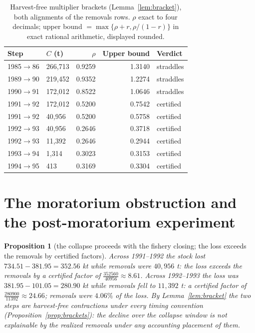 \documentclass[10pt,twocolumn]{article}
\theoremstyle{plain}
\newtheorem{proposition}[theorem]{Proposition}
\theoremstyle{remark}
\begin{document}
\begin{table}[t]
\centering
\scriptsize
\setlength{\tabcolsep}{3.2pt}
\caption{Harvest-free multiplier brackets (Lemma~\ref{lem:bracket}),
both alignments of the removals rows. \(\rho\) exact to four decimals;
upper bound \(=\max\{\rho+r, \rho/(1-r)\}\) in exact rational
arithmetic, displayed rounded.}
\label{tab:brackets}
\begin{tabular}{@{}l l r r l@{}}
\toprule
Step & \(C\) (t) & \(\rho\) & Upper bound & Verdict \\
\midrule
1985$\to$86 & 266{,}713 & 0.9259 & 1.3140 & straddles \\
1989$\to$90 & 219{,}452 & 0.9352 & 1.2274 & straddles \\
1990$\to$91 & 172{,}012 & 0.8522 & 1.0646 & straddles \\
1991$\to$92 & 172{,}012 & 0.5200 & 0.7542 & certified \\
1991$\to$92 & 40{,}956 & 0.5200 & 0.5758 & certified \\
1992$\to$93 & 40{,}956 & 0.2646 & 0.3718 & certified \\
1992$\to$93 & 11{,}392 & 0.2646 & 0.2944 & certified \\
1993$\to$94 & 1{,}314 & 0.3023 & 0.3153 & certified \\
1994$\to$95 & 413 & 0.3169 & 0.3304 & certified \\
\bottomrule
\end{tabular}
\end{table}

\section{The moratorium obstruction and the post-moratorium
experiment}\label{moratorium}

\begin{proposition}[the collapse proceeds with the fishery closing;
the loss exceeds the removals by certified factors]
\label{prop:moratorium}
Across 1991--1992 the stock lost \(734.51 - 381.95 = 352.56\) kt while
removals were \(40{,}956\) t: the loss exceeds the removals by a
certified factor of \(\tfrac{352560}{40956} \approx 8.61\). Across
1992--1993 the loss was \(381.95 - 101.05 = 280.90\) kt while removals
fell to \(11{,}392\) t: a certified factor of
\(\tfrac{280900}{11392} \approx 24.66\); removals were \(4.06\%\) of
the loss. By Lemma~\ref{lem:bracket} the two steps are harvest-free
contractions under every timing convention
(Proposition~\ref{prop:brackets}): the decline over the collapse window
is not explainable by the realized removals under any accounting
placement of them.
\end{proposition}
\end{document}
